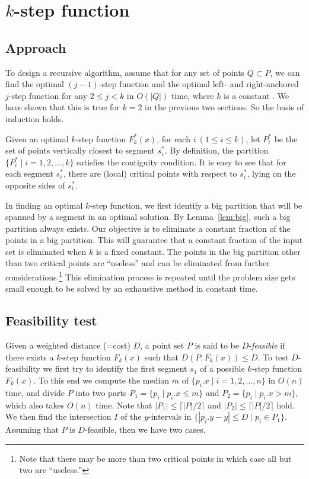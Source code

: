 \documentclass[preprint,10pt]{elsarticle}
\begin{document}
\section{$k$-step function}\label{sec:kstep}
\subsection{Approach}
To design a recursive algorithm, assume that for any set of points $Q\subset P$,
we can find the optimal $(j-1)$-step function and the optimal left- and right-anchored $j$-step function 
for any $2\leq j < k$ in $O(|Q|)$ time,
where $k$ is a constant .
We have shown that this is true for $k=2$ in the previous two sections.
So the basis of induction holds.

Given an optimal $k$-step function $F^*_k(x)$, for each $i~(1\leq i \leq k)$,
let $P^*_i$ be the set of points vertically closest to segment $s^*_i$.
By definition, the partition
$\{P^*_i \mid i = 1, 2, \ldots, k\}$ satisfies the contiguity condition.
It is easy to see that
for each segment $s^*_i$, there are (local) critical points with respect to $s^*_i$,
lying on the opposite sides of $s^*_i$.

In finding an optimal $k$-step function,
we first identify a big partition that will be spanned by a segment in
an optimal solution.
By Lemma~\ref{lem:big},
such a big partition always exists.
Our objective is to eliminate a constant fraction of the points in a big partition.
This will guarantee that a constant fraction of the input set is eliminated when $k$ is a fixed constant.
The points in the big partition other than two critical points are ``useless''
and can be eliminated from further considerations.\footnote{Note that there may
be more than two critical points in which case all but two are ``useless.''}
This elimination process is repeated until the problem size gets small enough
to be solved by an exhaustive method in constant time.

\subsection{Feasibility test}\label{sec:feasibility}
Given a weighted distance (=cost) $D$,
a point set $P$ is said to be $D$-{\em feasible} if there exists a $k$-step function
$F_k(x)$ such that $D(P,F_k(x)) \leq D$. 
To test $D$-feasibility
we first try to identify the first segment $s_1$ of a possible $k$-step function $F_k(x)$.
To this end we compute the median $m$ of $\{p_i.x\mid i = 1, 2,\ldots, n\}$ in $O(n)$ time,
and divide $P$ into two parts $P_1 = \{p_i \mid p_i.x \leq m\}$ and $P_2 = \{p_i \mid p_i.x > m\}$,
which also takes $O(n)$ time.
Note that $|P_1| \leq \lceil |P|/2\rceil$ and $|P_2| \leq \lceil |P|/2\rceil$ hold.
We then find the intersection $I$ of the $y$-intervals in $\{|p_i.y-y| \leq D \mid p_i \in P_1\}$.
Assuming that $P$ is $D$-feasible,
then we have two cases.
\end{document}
